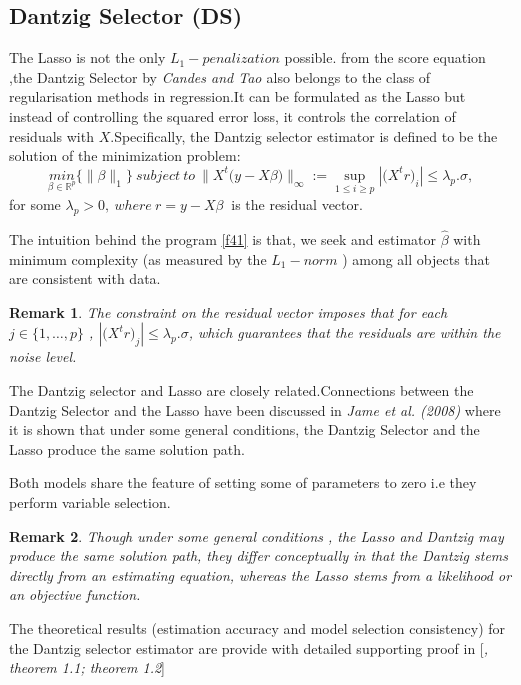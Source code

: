 \documentclass[12pt]{report}
\newtheorem{remarque}{Remark}[section]
\begin{document}
	\subsection{Dantzig Selector (DS)}
	The Lasso is not the only $L_{1}-penalization$ possible. from the score equation ,the Dantzig Selector by \textit{Candes and Tao \cite{nref12}} also belongs to the class of regularisation methods in regression.It can be formulated as the Lasso but instead of controlling the squared error loss, it controls the correlation of residuals with $X$.Specifically, the Dantzig selector estimator is defined to be the solution of the minimization problem:
	\begin{equation}
		\underset{\beta\in \mathbb{R}^{p}}{min} \big\{\parallel \beta\parallel_{1}\big\}\ subject\ to\ \parallel X^{t}\big(y-X\beta\big) \parallel_{\infty}:=\underset{1\leq i \geq p}{\sup}|\big(X^{t}r\big)_{i}|\leq \lambda_{p}.\sigma,
		\label{f41}
	\end{equation}
 for some $\lambda_{p}>0,\ where\ r=y-X\beta\ $ is the residual vector.
 
 The intuition behind the program \eqref{f41} is that, we seek and estimator $ \hat{\beta}$ with minimum complexity (as measured by the $L_{1}-norm$ ) among all objects that are consistent with data.
 \begin{remarque}
 	The constraint on the residual vector imposes that for each $j\in \{1,\dots, p\}$ , $|\big(X^{t}r\big)_{j}|\leq \lambda_{p}.\sigma$, which guarantees that the residuals are within the noise level.
 \end{remarque}

The Dantzig selector and Lasso are closely related.Connections between the Dantzig Selector and the Lasso have been discussed in \textit{Jame et al. (2008)} where it is shown that under some general conditions, the Dantzig Selector and the Lasso produce the same solution path.

Both models share the feature of setting some of parameters to zero i.e they perform variable selection.
 
 \begin{remarque}
 	Though under some general conditions , the Lasso and Dantzig may produce the same solution path, they differ conceptually in that the Dantzig stems directly from an estimating equation, whereas the Lasso stems from a likelihood or an objective function.
 \end{remarque}
The theoretical results (estimation accuracy and model selection consistency) for the Dantzig selector estimator are provide with detailed supporting proof in [\textit{\cite{nref12}, theorem 1.1; theorem 1.2}]
\end{document}

